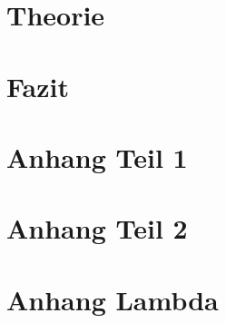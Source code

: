 \documentclass[12pt,titlepage,twoside]{article}
\begin{document}
\section{Theorie}





\clearpage
{}
\fancyfoot[C]{\thepage} %

\section{Fazit}



\newpage





\newpage
{}	%




\newpage
{}


\clearpage
\setcounter{page}{0}

\renewcommand{\thepage}{A-\arabic{page}}

\begin{appendices}

\section{Anhang Teil 1}

\section{Anhang Teil 2}


\section{Anhang Lambda}


\end{appendices}


\end{document}

